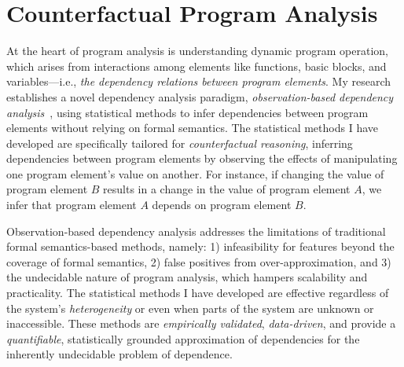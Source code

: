 \documentclass{article}
\begin{document}



\section{Counterfactual Program Analysis}
\label{sec:dependency}

At the heart of program analysis is understanding dynamic program operation, which arises from interactions among elements like functions, basic blocks, and variables—i.e., \emph{the dependency relations between program elements}. My research establishes a novel dependency analysis paradigm, \emph{observation-based dependency analysis}~\cite{leeEvaluatingLexicalApproximation2020,leeObservationbasedApproximateDependency2021,leeCausalProgramDependence2025a}, using statistical methods to infer dependencies between program elements without relying on formal semantics. The statistical methods I have developed are specifically tailored for \emph{counterfactual reasoning}, inferring dependencies between program elements by observing the effects of manipulating one program element's value on another. For instance, if changing the value of program element $B$ results in a change in the value of program element $A$, we infer that program element $A$ depends on program element $B$.

Observation-based dependency analysis addresses the limitations of traditional formal semantics-based methods, namely: 1) infeasibility for features beyond the coverage of formal semantics, 2) false positives from over-approximation, and 3) the undecidable nature of program analysis, which hampers scalability and practicality. The statistical methods I have developed are effective regardless of the system’s \emph{heterogeneity} or even when parts of the system are unknown or inaccessible. These methods are \emph{empirically validated}, \emph{data-driven}, and provide a \emph{quantifiable}, statistically grounded approximation of dependencies for the inherently undecidable problem of dependence.

\end{document}
